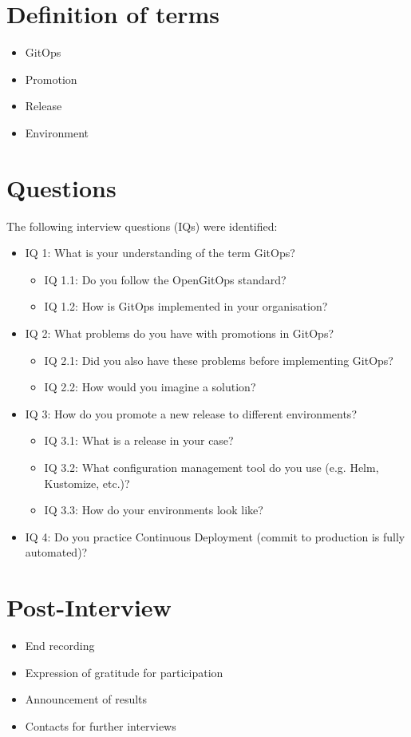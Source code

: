 \section{Definition of terms}

\begin{itemize}
	\item GitOps
	\item Promotion
	\item Release
	\item Environment
\end{itemize}

\section{Questions}\label{appendix:interview-questions}

The following interview questions (IQs) were identified:

\begin{itemize}
	\item IQ 1: What is your understanding of the term GitOps?
	\begin{itemize}
		\item IQ 1.1: Do you follow the OpenGitOps standard?
		\item IQ 1.2: How is GitOps implemented in your organisation?
	\end{itemize}

	\item IQ 2: What problems do you have with promotions in GitOps?
	\begin{itemize}
		\item IQ 2.1: Did you also have these problems before implementing GitOps?
		\item IQ 2.2: How would you imagine a solution?
	\end{itemize}

	\item IQ 3: How do you promote a new release to different environments?
	\begin{itemize}
	        \item IQ 3.1: What is a release in your case?
		\item IQ 3.2: What configuration management tool do you use (e.g. Helm, Kustomize, etc.)?
		\item IQ 3.3: How do your environments look like?
	\end{itemize}
	
	\item IQ 4: Do you practice Continuous Deployment (commit to production is fully automated)?

\end{itemize}

\section{Post-Interview}

\begin{itemize}
	\item End recording
	\item Expression of gratitude for participation
	\item Announcement of results
	\item Contacts for further interviews
\end{itemize}
